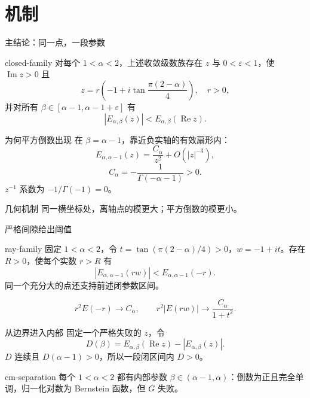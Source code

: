 \documentclass{beamer}
\begin{document}
\section{机制}
\begin{frame}{主结论：同一点，一段参数}
\begin{bookresult}{closed-family}
对每个 $1{<} \alpha{<} 2$，上述收敛级数族存在 $z$ 与 $0{<} \varepsilon{<} 1$，使 $\operatorname{Im}z>0$ 且
\[
z=r\left(-1+i\tan\frac{\pi(2-\alpha)}4\right),\quad r>0,
\]
并对所有 $\beta\in[\alpha-1,\alpha-1+\varepsilon]$ 有
\[
|E_{\alpha,\beta}(z)|{<} E_{\alpha,\beta}(\operatorname{Re}z).
\]
\end{bookresult}
\end{frame}
\begin{frame}{为何平方倒数出现}
在 $\beta=\alpha-1$，靠近负实轴的有效扇形内：
\[
E_{\alpha,\alpha-1}(z)=\frac{C_\alpha}{z^2}+O(|z|^{-3}),
\]
\[
C_\alpha=-\frac1{\Gamma(-\alpha-1)}>0.
\]
$z^{-1}$ 系数为 $-1/\Gamma(-1)=0$。
\begin{block}{几何机制}
同一横坐标处，离轴点的模更大；平方倒数的模更小。
\end{block}
\end{frame}
\begin{frame}{严格间隙给出阈值}
\begin{bookresult}{ray-family}
固定 $1{<} \alpha{<} 2$，令 $t=\tan(\pi(2-\alpha)/4)>0$，$w=-1+it$。存在 $R>0$，使每个实数 $r>R$ 有
\[
|E_{\alpha,\alpha-1}(rw)|{<} E_{\alpha,\alpha-1}(-r).
\]
同一个充分大的点还支持前述闭参数区间。
\end{bookresult}
\[
r^2 E(-r)\to C_\alpha,\qquad r^2|E(rw)|\to\frac{C_\alpha}{1+t^2}.
\]
\end{frame}
\begin{frame}{从边界进入内部}
固定一个严格失败的 $z$，令
\[
D(\beta)=E_{\alpha,\beta}(\operatorname{Re}z)-|E_{\alpha,\beta}(z)|.
\]
$D$ 连续且 $D(\alpha-1)>0$，所以一段闭区间内 $D>0$。
\begin{bookresult}{cm-separation}
每个 $1{<} \alpha{<} 2$ 都有内部参数 $\beta\in(\alpha-1,\alpha)$：倒数为正且完全单调，归一化对数为 Bernstein 函数，但 $G$ 失败。
\end{bookresult}
\end{frame}
\end{document}
